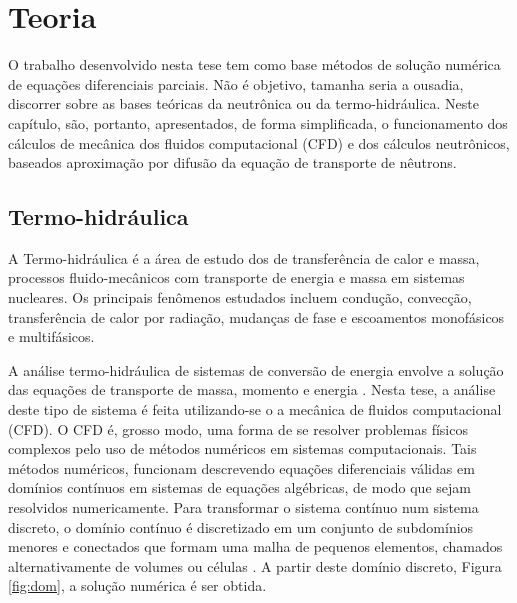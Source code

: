 \chapter{Teoria}
\label{chap:teoria}

O trabalho desenvolvido nesta tese tem como base métodos de
solução numérica de equações diferenciais parciais. Não é objetivo,
tamanha seria a ousadia, discorrer sobre as bases teóricas da neutrônica ou
da termo-hidráulica. Neste capítulo, são, portanto, apresentados, de forma simplificada,
o funcionamento dos cálculos de mecânica dos fluidos computacional (CFD) e dos
cálculos neutrônicos, baseados aproximação por difusão da equação de transporte
de nêutrons.


\section{Termo-hidráulica}
\label{sec:th}

A Termo-hidráulica é a área de estudo dos de transferência
de calor e massa, processos fluido-mecânicos com transporte de energia e
massa em sistemas nucleares. Os principais fenômenos estudados incluem condução,
convecção, transferência de calor por radiação, mudanças de fase e escoamentos
monofásicos e multifásicos.

A análise termo-hidráulica de sistemas de conversão de energia envolve a solução
das equações de transporte de massa, momento e energia \cite{Todreas2012}. Nesta
tese, a análise deste tipo de sistema é feita utilizando-se o a mecânica
de fluidos computacional (CFD). O CFD é, grosso modo, uma forma de se resolver
problemas físicos complexos pelo uso de métodos numéricos em sistemas
computacionais. Tais métodos numéricos, funcionam descrevendo equações diferenciais
válidas em domínios contínuos em sistemas de equações algébricas, de modo que
sejam resolvidos numericamente. Para transformar o sistema contínuo num sistema
discreto, o domínio contínuo é discretizado em um conjunto de subdomínios menores
e conectados que formam uma malha de pequenos elementos, chamados
alternativamente de volumes ou células \cite{dosSantos2012}. 
A partir deste domínio discreto, Figura \ref{fig:dom}, a solução numérica é ser obtida.

